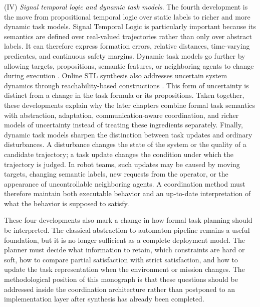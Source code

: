 (IV) \emph{Signal temporal logic and dynamic task models}. The fourth
development is the move from propositional temporal logic over static labels to richer and
more dynamic task models. Signal Temporal Logic is particularly important because its
semantics are defined over real-valued trajectories rather than only over abstract labels.
It can therefore express formation errors, relative distances, time-varying predicates,
and continuous safety margins.  Dynamic
task models go further by allowing targets, propositions, semantic features, or
neighboring agents to change during execution \citep{zhang2024reactive,
kalluraya2023multirobot}. {\color{blue}Online STL synthesis also addresses
uncertain system dynamics through reachability-based constructions
\citep{yu2024online}. This form of uncertainty is distinct from a change in the
task formula or its propositions.} Taken together, these developments explain
why the later chapters combine formal task semantics with abstraction, adaptation,
communication-aware coordination, and richer models of uncertainty instead of treating
these ingredients separately.
Finally, dynamic task models sharpen the distinction between task updates and ordinary
disturbances. A disturbance changes the state of the system or the quality of a candidate
trajectory; a task update changes the condition under which the trajectory is judged. In
robot teams, such updates may be caused by moving targets, changing semantic labels, new
requests from the operator, or the appearance of uncontrollable neighboring agents. A
coordination method must therefore maintain both executable behavior and an up-to-date
interpretation of what the behavior is supposed to satisfy.


These four developments also mark a change in how formal task planning should be
interpreted. The classical abstraction-to-automaton pipeline remains a useful foundation,
but it is no longer sufficient as a complete deployment model. The planner must decide
what information to retain, which constraints are hard or soft, how to compare partial
satisfaction with strict satisfaction, and how to update the task representation when the
environment or mission changes. The methodological position of this monograph is that
these questions should be addressed inside the coordination architecture rather than
postponed to an implementation layer after synthesis has already been completed.
